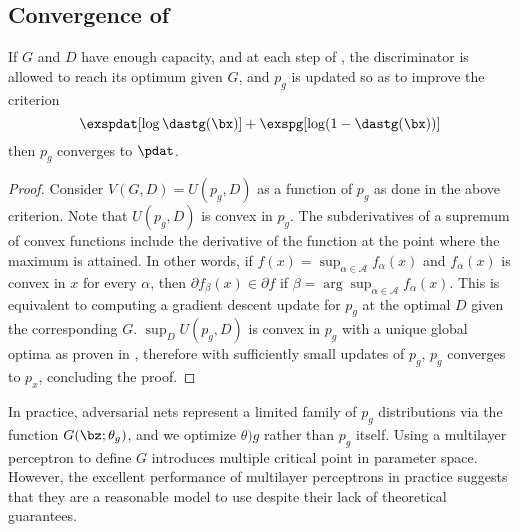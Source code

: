 \subsection{Convergence of %
}
\begin{proposition}
	If $G$ and $D$ have enough capacity, and at each step of %
	, the discriminator is allowed to reach its optimum given $G$, and $p_g$ is updated so as to improve the criterion
	\begin{equation*}
		\exspdat[\log\dastg(\bx)] + \exspg[\log(1-\dastg(\bx))]
	\end{equation*}
	then $p_g$ converges to $\pdat$.%
\end{proposition}

\begin{proof}
	Consider $V(G,D)=U(p_g,D)$ as a function of $p_g$ as done in the above criterion. Note that $U(p_g,D)$ is convex in $p_g$. The subderivatives of a supremum of  convex functions include the derivative of the function at the point where the maximum is attained. In other words, if $f(x)=\sup_{\alpha\in\mathcal{A}}f_{\alpha}(x)$ and $f_{\alpha}(x)$ is convex in $x$ for every $\alpha$, then $\partial f_{\beta}(x)\in\partial f$ if $\beta=\arg\sup_{\alpha\in\mathcal{A}}f_{\alpha}(x)$. This is equivalent to computing a gradient descent update for $p_g$ at the optimal $D$ given the corresponding $G$. $\sup_DU(p_g, D)$ is convex in $p_g$ with a unique global optima as proven in %
	, therefore with sufficiently small updates of $p_g$, $p_g$ converges to $p_x$, concluding the proof.
\end{proof}

In practice, adversarial nets represent a limited family of $p_g$ distributions via the function $G(\bz; \theta_g)$, and we optimize $\theta)g$ rather than $p_g$ itself. Using a multilayer perceptron to define $G$ introduces multiple critical point in parameter space. However, the excellent performance of multilayer perceptrons in practice suggests that they are a reasonable model to use despite their lack of theoretical guarantees.